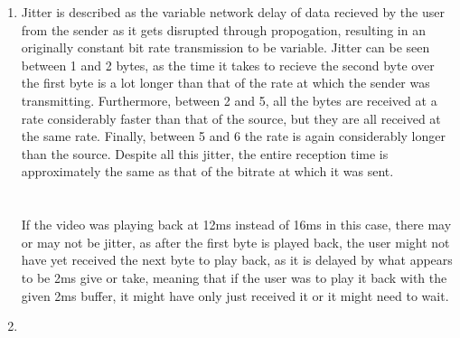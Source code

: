 \documentclass[12pt]{article}
\begin{document}
\begin{enumerate}
\begin{enumerate}
		\end{enumerate}

	\item Jitter is described as the variable network delay of data recieved by the user from the sender as it gets disrupted through propogation, resulting in an originally constant bit rate transmission to be variable. Jitter can be seen between 1 and 2 bytes, as the time it takes to recieve the second byte over the first byte is a lot longer than that of the rate at which the sender was transmitting. Furthermore, between 2 and 5, all the bytes are received at a rate considerably faster than that of the source, but they are all received at the same rate. Finally, between 5 and 6 the rate is again considerably longer than the source. Despite all this jitter, the entire reception time is approximately the same as that of the bitrate at which it was sent.\\
	\\
	\\
	If the video was playing back at 12ms instead of 16ms in this case, there may or may not be jitter, as after the first byte is played back, the user might not have yet received the next byte to play back, as it is delayed by what appears to be 2ms give or take, meaning that if the user was to play it back with the given 2ms buffer, it might have only just received it or it might need to wait.

	\item \begin{enumerate}


\end{enumerate}
\end{enumerate}
\end{document}
